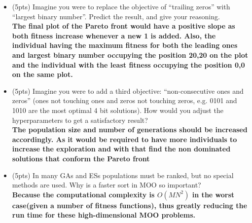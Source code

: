 \documentclass[11pt, a4paper]{article}
\begin{document}
\begin{itemize}
	\item (5pts) Imagine you were to replace the objective of ``trailing zeros'' with ``largest binary number''. Predict the result, and give your reasoning.\\
	\textbf{ The final plot of the Pareto front would have a positive slope as both fitness increase whenever a new 1 is added. Also, the individual having the maximum fitness for both the leading ones and largest binary number occupying the position 20,20 on the plot and the individual with the least fitness occupying the position 0,0 on the same plot.}
	\item (5pts) Imagine you were to add a third objective: ``non-consecutive ones and zeros'' (ones not touching ones and zeros not touching zeros, e.g. 0101 and 1010 are the most optimal 4 bit solutions). How would you adjust the hyperparameters to get a satisfactory result?\\
	\textbf{The population size and number of generations should be increased accordingly. As it would be required to have more individuals to increase the exploration and with that find the non dominated solutions that conform the Pareto front}
	\item (5pts) In many GAs and ESs populations must be ranked, but no special methods are used. Why is a faster sort in MOO so important?\\
	\textbf{Because the computational complexity is $O(MN^2)$ in the worst case(given a number of fitness functions), thus greatly reducing the run time for these high-dimensional MOO problems.}
\end{itemize}


\newpage
\end{document}
